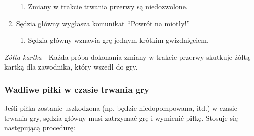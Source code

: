 \documentclass[12pt]{article}
\begin{document}
\begin{enumerate}
  \begin{enumerate}
  \item
        Zmiany w trakcie trwania przerwy są niedozwolone.
      \end{enumerate}
\item
  Sędzia główny wygłasza komunikat ``Powrót na miotły!''

  \begin{enumerate}
  \item
        Sędzia główny wznawia grę jednym krótkim gwizdnięciem.
      \end{enumerate}
\end{enumerate}

\emph{Zółta kartka} - Każda próba dokonania zmiany w trakcie przerwy
skutkuje żółtą kartką dla zawodnika, który wszedł do gry.

\subsubsection{Wadliwe piłki w czasie trwania gry}

Jeśli piłka zostanie uszkodzona (np. będzie niedopompowana, itd.) w
czasie trwania gry, sędzia główny musi zatrzymać grę i wymienić piłkę.
Stosuje się następującą procedurę:
\end{document}
